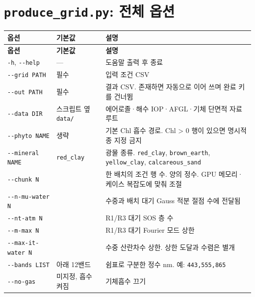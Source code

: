 \section{\texttt{produce\_\allowbreak{}grid.\allowbreak{}py}: 전체 옵션}
\label{sec:auto:06_python_batch:4}

{\TableFont
\begin{longtable}{@{}>{\raggedright\arraybackslash}p{}>{\raggedright\arraybackslash}p{}>{\raggedright\arraybackslash}p{}@{}}
\toprule
\textbf{옵션} & \textbf{기본값} & \textbf{설명} \\
\midrule
\endfirsthead
\toprule
\textbf{옵션} & \textbf{기본값} & \textbf{설명} \\
\midrule
\endhead
\bottomrule
\endfoot
\texttt{-\allowbreak{}h}, \texttt{-\allowbreak{}-\allowbreak{}help} & --- & 도움말 출력 후 종료 \\
\texttt{-\allowbreak{}-\allowbreak{}grid PATH} & 필수 & 입력 조건 CSV \\
\texttt{-\allowbreak{}-\allowbreak{}out PATH} & 필수 & 결과 CSV. 존재하면 자동으로 이어 쓰며 완료 키를 건너뜀 \\
\texttt{-\allowbreak{}-\allowbreak{}data DIR} & 스크립트 옆 \texttt{data/\allowbreak{}} & 에어로졸·해수 IOP·AFGL·기체 단면적 자료 루트 \\
\texttt{-\allowbreak{}-\allowbreak{}phyto NAME} & 생략 & 기본 Chl 흡수 경로. Chl > 0 행이 있으면 명시적 종 지정 금지 \\
\texttt{-\allowbreak{}-\allowbreak{}mineral NAME} & \texttt{red\_\allowbreak{}clay} & 광물 종류. \texttt{red\_\allowbreak{}clay}, \texttt{brown\_\allowbreak{}earth}, \texttt{yellow\_\allowbreak{}clay}, \texttt{calcareous\_\allowbreak{}sand} \\
\texttt{-\allowbreak{}-\allowbreak{}chunk N} & 64 & 한 배치의 조건 행 수. 양의 정수. GPU 메모리·케이스 복잡도에 맞춰 조절 \\
\texttt{-\allowbreak{}-\allowbreak{}n-\allowbreak{}mu-\allowbreak{}water N} & 24 & 수중과 배치 대기 Gauss 적분 절점 수에 전달됨 \\
\texttt{-\allowbreak{}-\allowbreak{}nt-\allowbreak{}atm N} & 400 & R1/R3 대기 SOS 층 수 \\
\texttt{-\allowbreak{}-\allowbreak{}m-\allowbreak{}max N} & 16 & R1/R3 대기 Fourier 모드 상한 \\
\texttt{-\allowbreak{}-\allowbreak{}max-\allowbreak{}it-\allowbreak{}water N} & 500 & 수중 산란차수 상한. 상한 도달과 수렴은 별개 \\
\texttt{-\allowbreak{}-\allowbreak{}bands LIST} & 아래 12밴드 & 쉼표로 구분한 정수 nm. 예: \texttt{443,\allowbreak{}555,\allowbreak{}865} \\
\texttt{-\allowbreak{}-\allowbreak{}no-\allowbreak{}gas} & 미지정, 흡수 켜짐 & 기체흡수 끄기 \\
\end{longtable}
}

